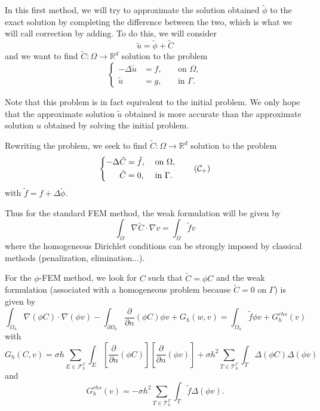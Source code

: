 In this first method, we will try to approximate the solution obtained $\tilde{\phi}$ to the exact solution by completing the difference between the two, which is what we will call correction by adding. To do this, we will consider
\begin{equation*}
	\tilde{u}=\tilde{\phi}+\tilde{C}
\end{equation*}
and we want to find $\tilde{C}: \Omega \rightarrow \mathbb{R}^d$ solution to the problem
\begin{equation*}
	\left\{\begin{aligned}
		-\Delta \tilde{u}&=f, \; &&\text{on } \Omega, \\
		\tilde{u}&=g, \; &&\text{in } \Gamma.
	\end{aligned}\right.
\end{equation*}
\begin{Rem}
	Note that this problem is in fact equivalent to the initial problem. We only hope that the approximate solution $\tilde{u}$ obtained is more accurate than the approximate solution $u$ obtained by solving the initial problem.
\end{Rem}
Rewriting the problem, we seek to find $\tilde{C}: \Omega \rightarrow \mathbb{R}^d$ solution to the problem
\begin{equation}
\label{eq.corr.pbc_add}
\left\{\begin{aligned}
	-\Delta \tilde{C}&=\tilde{f}, \; &&\text{on } \Omega, \\
	\tilde{C}&=0, \; &&\text{in } \Gamma.
\end{aligned}\right. \tag{$\mathcal{C}_{+}$}
\end{equation}
with $\tilde{f}=f+\Delta\tilde{\phi}$.

Thus for the standard FEM method, the weak formulation will be given by
\begin{equation*}
	\int_\Omega \nabla\tilde{C}\cdot\nabla v=\int_\Omega \tilde{f}v
\end{equation*}
where the homogeneous Dirichlet conditions can be strongly imposed by classical methods (penalization, elimination...).

For the $\phi$-FEM method, we look for $C$ such that $\tilde{C}=\phi C$ and the weak formulation (associated with a homogeneous problem because $\tilde{C}=0$ on $\Gamma$) is given by
\begin{equation*}
	\int_{\Omega_h} \nabla (\phi C) \cdot \nabla (\phi v) - \int_{\partial\Omega_h} \frac{\partial}{\partial n}(\phi C)\phi v+G_h(w,v)=\int_{\Omega_h} \tilde{f} \phi v + G_h^{rhs}(v)
\end{equation*}
with
\begin{equation*}
	G_h(C,v)=\sigma h\sum_{E\in\mathcal{F}_h^\Gamma} \int_E \left[\frac{\partial}{\partial n}(\phi C)\right] \left[\frac{\partial}{\partial n}(\phi v)\right]+\sigma h^2\sum_{T\in\mathcal{T}_h^\Gamma} \int_{T} \Delta(\phi C)\Delta(\phi v)
\end{equation*}
and
\begin{equation*}
	G_h^{rhs}(v)=-\sigma h^2\sum_{T\in\mathcal{T}_h^\Gamma} \int_{T} \tilde{f} \Delta(\phi v).
\end{equation*}

